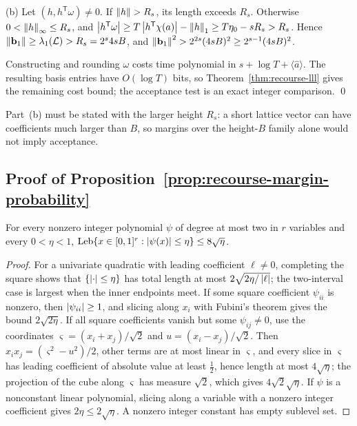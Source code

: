 (b) Let $(h,h^{\mathsf T}\omega)\ne0$. If $\left\lVert h\right\rVert>R_s$, its length
exceeds $R_s$. Otherwise $0<\left\lVert h\right\rVert_\infty\le R_s$, and
$\left\lvert h^{\mathsf T}\omega\right\rvert\ge T\left\lvert h^{\mathsf T}\chi(a)\right\rvert-\left\lVert h\right\rVert_1\ge
T\eta_0-sR_s>R_s$. Hence $\left\lVert\mathbf b_1\right\rVert\ge\lambda_1(\mathcal L)>R_s=2^s4sB$,
and $\left\lVert\mathbf b_1\right\rVert^2>2^{2s}(4sB)^2\ge2^{s-1}(4sB)^2$.

Constructing and rounding $\omega$ costs time polynomial in
$s+\log T+\langle\hat a\rangle$. The resulting basis entries have
$O(\log T)$ bits, so Theorem~\ref{thm:recourse-lll} gives the remaining
cost bound; the acceptance test is an exact integer comparison. \qed

Part~(b) must be stated with the larger height $R_s$: a short lattice
vector can have coefficients much larger than $B$, so margins over the
height-$B$ family alone would not imply acceptance.

\subsection{Proof of Proposition~\ref{prop:recourse-margin-probability}}
\label{app:recourse-margin}

\begin{lemma}
\label{lem:recourse-sublevel}
For every nonzero integer polynomial $\psi$ of degree at most two in $r$
variables and every $0<\eta<1$,
$\operatorname{Leb}\{x\in[0,1]^r:\left\lvert\psi(x)\right\rvert\le\eta\}\le8\sqrt\eta$.
\end{lemma}

\begin{proof}
For a univariate quadratic with leading coefficient $\ell\ne0$,
completing the square shows that $\{\left\lvert\cdot\right\rvert\le\eta\}$ has total
length at most $2\sqrt{2\eta/\left\lvert\ell\right\rvert}$; the two-interval case is
largest when the inner endpoints meet. If some square coefficient
$\psi_{ii}$ is nonzero, then $\left\lvert\psi_{ii}\right\rvert\ge1$, and slicing along
$x_i$ with Fubini's theorem gives the bound $2\sqrt{2\eta}$. If all
square coefficients vanish but some $\psi_{ij}\ne0$, use the coordinates
$\varsigma=(x_i+x_j)/\sqrt2$ and $u=(x_i-x_j)/\sqrt2$. Then
$x_ix_j=(\varsigma^2-u^2)/2$, other terms are at most linear in
$\varsigma$, and every slice in $\varsigma$ has leading coefficient of
absolute value at least $\frac12$, hence length at most $4\sqrt\eta$;
the projection of the cube along $\varsigma$ has measure $\sqrt2$, which
gives $4\sqrt2\sqrt\eta$. If $\psi$ is a nonconstant linear polynomial,
slicing along a variable with a nonzero integer coefficient gives
$2\eta\le2\sqrt\eta$. A nonzero integer constant has empty sublevel set.
\end{proof}

